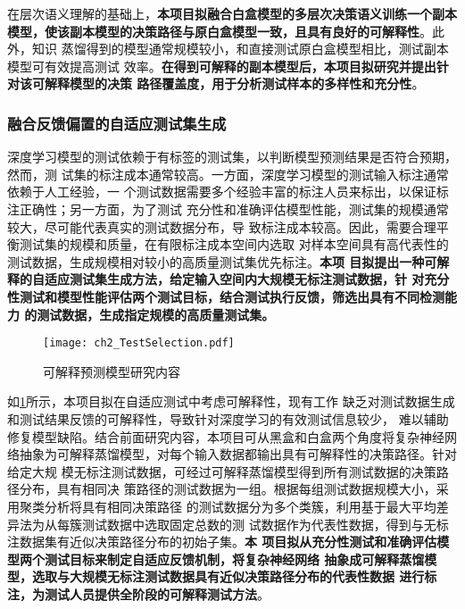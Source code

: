 在层次语义理解的基础上，\textbf{本项目拟融合白盒模型的多层次决策语义训练一个副本
模型，使该副本模型的决策路径与原白盒模型一致，且具有良好的可解释性}。此外，知识
蒸馏得到的模型通常规模较小，和直接测试原白盒模型相比，测试副本模型可有效提高测试
效率。\textbf{在得到可解释的副本模型后，本项目拟研究并提出针对该可解释模型的决策
路径覆盖度，用于分析测试样本的多样性和充分性}。

\subsubsection{融合反馈偏置的自适应测试集生成}
深度学习模型的测试依赖于有标签的测试集，以判断模型预测结果是否符合预期，然而，测
试集的标注成本通常较高。一方面，深度学习模型的测试输入标注通常依赖于人工经验，一
个测试数据需要多个经验丰富的标注人员来标出，以保证标注正确性；另一方面，为了测试
充分性和准确评估模型性能，测试集的规模通常较大，尽可能代表真实的测试数据分布，导
致标注成本较高。因此，{需要合理平衡测试集的规模和质量，在有限标注成本空间内选取
对样本空间具有高代表性的测试数据，生成规模相对较小的高质量测试集优先标注}。\textbf{本项
目拟提出一种可解释的自适应测试集生成方法，给定输入空间内大规模无标注测试数据，针
对充分性测试和模型性能评估两个测试目标，结合测试执行反馈，筛选出具有不同检测能力
的测试数据，生成指定规模的高质量测试集。}

\begin{figure}[htp]
    \begin{small}
        \begin{center}
            \texttt{[image: ch2\_TestSelection.pdf]}
        \end{center}
        \caption{可解释预测模型研究内容}
        \label{fig:ch2:testselection}
    \end{small}
\end{figure}

如\cref{fig:ch2:testselection}所示，本项目拟在自适应测试中考虑可解释性，现有工作
缺乏对测试数据生成和测试结果反馈的可解释性，导致针对深度学习的有效测试信息较少，
难以辅助修复模型缺陷。结合前面研究内容，本项目可从黑盒和白盒两个角度将复杂神经网
络抽象为可解释蒸馏模型，对每个输入数据都输出具有可解释性的决策路径。针对给定大规
模无标注测试数据，可经过可解释蒸馏模型得到所有测试数据的决策路径分布，具有相同决
策路径的测试数据为一组。根据每组测试数据规模大小，采用聚类分析将具有相同决策路径
的测试数据分为多个类簇，利用基于最大平均差异法为从每簇测试数据中选取固定总数的测
试数据作为代表性数据，得到与无标注数据集有近似决策路径分布的初始子集。\textbf{本
项目拟从充分性测试和准确评估模型两个测试目标来制定自适应反馈机制，将复杂神经网络
抽象成可解释蒸馏模型，选取与大规模无标注测试数据具有近似决策路径分布的代表性数据
进行标注，为测试人员提供全阶段的可解释测试方法}。


